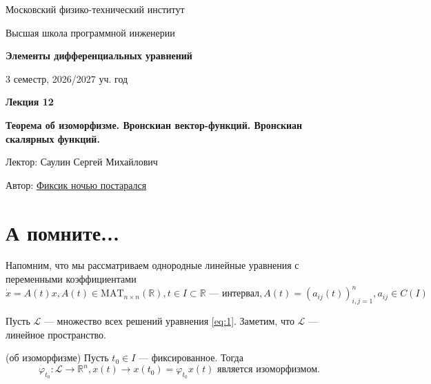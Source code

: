 \documentclass[11pt]{article}
\newcommand{\lectureNumber}{12}
\newcommand{\lectureTitle}{Теорема об изоморфизме. Вронскиан вектор-функций. Вронскиан скалярных функций.}
\newcommand{\courseName}{Элементы дифференциальных уравнений}
\newcommand{\semester}{3 семестр, 2026/2027 уч. год}
\begin{document}
\begin{titlepage}
    \centering
    
    {\large Московский физико-технический институт \par}
    {\large Высшая школа программной инженерии \par}
    \vspace{2cm}

    {\Large \textbf{\courseName} \par}
    {\large \semester \par}
    
    \vspace*{\fill}

    {\Huge \textbf{Лекция \lectureNumber} \par}
    {\Huge \textbf{\lectureTitle} \par}
    
    \vspace*{\fill}
    
    {\large Лектор: Саулин Сергей Михайлович \par}
    {\large Автор: \href{https://t.me/mallina_olga}{Фиксик ночью постарался} \par}

\end{titlepage}


\section{А помните...}
Напомним, что мы рассматриваем однородные линейные уравнения с переменными коэффициентами
\begin{equation}
   \dot{x}= A(t)x, A(t)\in \mathrm{MAT}_{n\times n} (\mathbb{R}), t\in I \subset \mathbb{R} \text{ --- интервал}, A(t) = (a_{ij}(t))_{i,j=1}^n, a_{ij} \in C(I)  
   \label{eq:1}
\end{equation}
 

\begin{remark}
      Пусть $\mathcal{L}$ --- множество всех решений уравнения \eqref{eq:1}. Заметим, что $\mathcal{L}$ --- линейное пространство. 
\end{remark}

\begin{theorem}
    (об изоморфизме) Пусть $t_0\in I$ --- фиксированное. Тогда 
    \[ \varphi_{t_0}: \mathcal{L} \to \mathbb{R}^n, x(t)\to x(t_0)=\varphi_{t_0} x(t) \text{ является изоморфизмом.} \]
\end{theorem}
\end{document}
